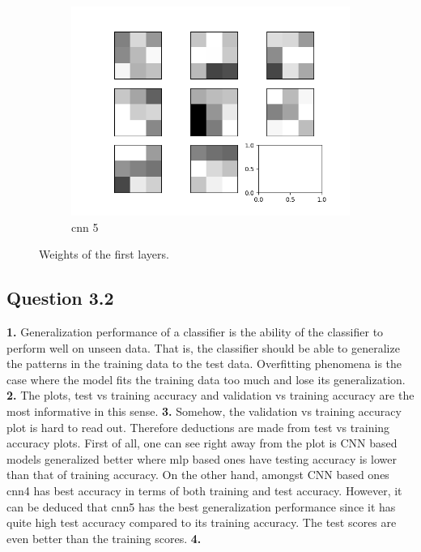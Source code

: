 \documentclass{assignment}
\begin{document}
\begin{figure}[htbp!]
\begin{subfigure}{0.3\textwidth}
        \includegraphics[width=\textwidth]{figures/weights_cnn_5.png}
        \caption{cnn 5}
    \end{subfigure}\hfill
    \caption{Weights of the first layers.}
    \label{fig:weights}
\end{figure}

\subsection{Question 3.2}

\textbf{1.}
Generalization performance of a classifier is the ability of the classifier to perform well on unseen data. That is, the classifier should be able to generalize the patterns in the training data to the test data. Overfitting phenomena is the case where the model fits the training data too much and lose its generalization.
\textbf{2.}
The plots, test vs training accuracy and validation vs training accuracy are the most informative in this sense.
\textbf{3.}
Somehow, the validation vs training accuracy plot is hard to read out. Therefore deductions are made from test vs training accuracy plots. First of all, one can see right away from the plot is CNN based models generalized  better where mlp based ones have testing accuracy is lower than that of training accuracy. On the other hand, amongst CNN based ones cnn4 has best accuracy in terms of both training and test accuracy. However, it can be deduced that cnn5 has the best generalization performance since it has quite high test accuracy compared to its training accuracy. The test scores are even better than the training scores. 
\textbf{4.}
\end{document}
